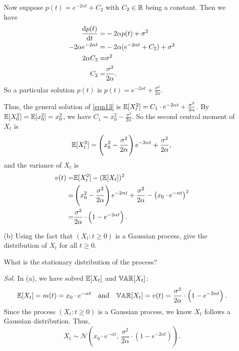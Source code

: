 \begin{enumerate}
    Now suppose $p(t) = e^{-2\alpha t} + C_2$ with $C_2 \in \mathbb{R}$ being a constant. Then we have
    \begin{align*}
        \frac{\dif p(t)}{\dif t} = & -2 \alpha p(t) + \sigma^2 \\ 
        -2 \alpha e^{-2 \alpha t} = & -2 \alpha (e^{-2\alpha t} + C_2 ) + \sigma^2 \\ 
        2 \alpha C_2 = & \sigma^2 \\ 
        C_2 = & \frac{\sigma^2}{2\alpha}.
    \end{align*}
    So a particular solution $p(t)$ is $p(t) = e^{-2\alpha t} +  \frac{\sigma^2}{2\alpha}$.

    Thus, the general solution of \eqref{eqn13} is $\mathbb{E} [X_t^2] = C_1 \cdot e^{-2\alpha t} +  \frac{\sigma^2}{2\alpha}$. By $\mathbb{E} [X_0^2] = \mathbb{E} [x_0^2] = x_0^2$, we have $C_1 = x_0^2 - \frac{\sigma^2}{2\alpha}$. So the second central moment of $X_t$ is 
    $$\mathbb{E}[X_t^2] = \left( x_0^2 - \frac{\sigma^2}{2\alpha} \right) e^{-2\alpha t} + \frac{\sigma^2}{2\alpha},$$
    and the variance of $X_t$ is 
    \begin{align*}
        v(t) = & \mathbb{E} [X_t^2] - (\mathbb{E}[X_t])^2 \\ 
        = &  \left( x_0^2 - \frac{\sigma^2}{2\alpha} \right) e^{-2\alpha t} + \frac{\sigma^2}{2\alpha} - \left( x_0 \cdot e^{-\alpha t} \right)^2 \\ 
        = &  \frac{\sigma^2}{2 \alpha} \cdot \left(1- e^{-2\alpha t} \right).
    \end{align*}

    \item[(b)] Using the fact that $(X_t: t\ge 0)$ is a Gaussian process, give the distribution of $X_t$ for all $t \ge 0$. 
    
    What is the stationary distribution of the process?

    \textit{ Sol. } In (a), we have solved $\mathbb{E}[X_t]$ and $\mathbb{VAR}[X_t]$:
    $$
    \mathbb{E}[X_t] = m(t) = x_0 \cdot e^{-\alpha t} \quad \text{and} \quad \mathbb{VAR}[X_t] = v(t) = \frac{\sigma^2}{2 \alpha} \cdot \left(1- e^{-2\alpha t} \right).
    $$
    Since the process $(X_t: t \ge 0)$ is a Gaussian process, we know $X_t$ follows a Gaussian distribution. Thus, 
    $$
    X_t \sim \mathcal{N}\left( x_0 \cdot e^{-\alpha t}, \, \frac{\sigma^2}{2 \alpha} \cdot \left(1- e^{-2\alpha t} \right) \right).
    $$


\end{enumerate}
